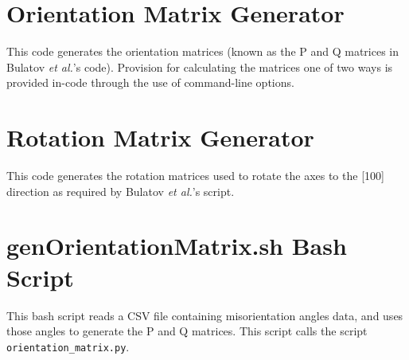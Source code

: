 \documentclass[twoside,senior]{BYUPhys}
\begin{document}
\chapter{Orientation Matrix Generator\label{app:OrientationMatrix}}
This code generates the orientation matrices (known as the P and Q matrices in Bulatov \emph{et al.}'s code). Provision for calculating the matrices one of two ways is provided in-code through the use of command-line options.



\chapter{Rotation Matrix Generator\label{app:RotationMatrix}}
This code generates the rotation matrices used to rotate the axes to the [100] direction as required by Bulatov \emph{et al.}'s script.



\chapter{genOrientationMatrix.sh Bash Script\label{app:genOrientationMatrix}}
This bash script reads a CSV file containing misorientation angles data, and uses those angles to generate the P and Q matrices.  This script calls the script \lstinline!orientation_matrix.py!.




 \cleardoublepage
 \singlespace
 \printindex
\end{document}
